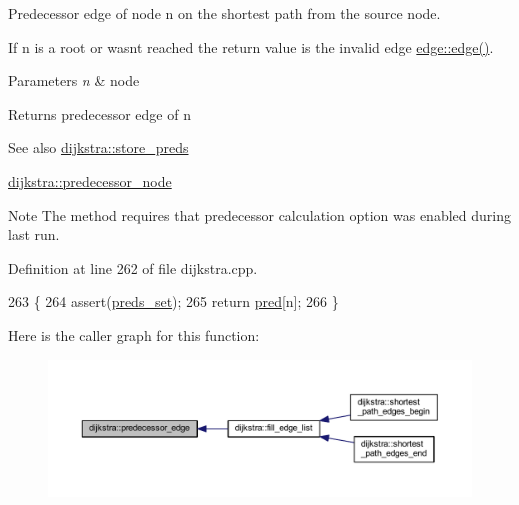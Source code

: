 Predecessor edge of node {\ttfamily n} on the shortest path from the source node. 

If {\ttfamily n} is a root or wasn\textquotesingle{}t reached the return value is the invalid edge \mbox{\hyperlink{classedge_a746a705d37781374c8d5991abd1f7f58}{edge\+::edge()}}.


\begin{DoxyParams}{Parameters}
{\em n} & node\\
\hline
\end{DoxyParams}
\begin{DoxyReturn}{Returns}
predecessor edge of {\ttfamily n} 
\end{DoxyReturn}
\begin{DoxySeeAlso}{See also}
\mbox{\hyperlink{classdijkstra_af79383dbbb6b737afcefd8e32350192d}{dijkstra\+::store\+\_\+preds}} 

\mbox{\hyperlink{classdijkstra_a99c17ee7c2b55574ea8c2952fac09faf}{dijkstra\+::predecessor\+\_\+node}}
\end{DoxySeeAlso}
\begin{DoxyNote}{Note}
The method requires that predecessor calculation option was enabled during last run. 
\end{DoxyNote}


Definition at line 262 of file dijkstra.\+cpp.


\begin{DoxyCode}
263 \{
264     assert(\mbox{\hyperlink{classdijkstra_aaba530e703b5d4005b3c01fa1a11182d}{preds\_set}});
265     \textcolor{keywordflow}{return} \mbox{\hyperlink{classdijkstra_a662d982b45b2992ecf7b7f7e6696f9f9}{pred}}[n];
266 \}
\end{DoxyCode}
Here is the caller graph for this function\+:\nopagebreak
\begin{figure}[H]
\begin{center}
\leavevmode
\includegraphics[width=350pt]{classdijkstra_aa3ef1a7d7dfc33e4a39aff309f873929_icgraph}
\end{center}
\end{figure}
\mbox{\label{classdijkstra_a99c17ee7c2b55574ea8c2952fac09faf}} 
